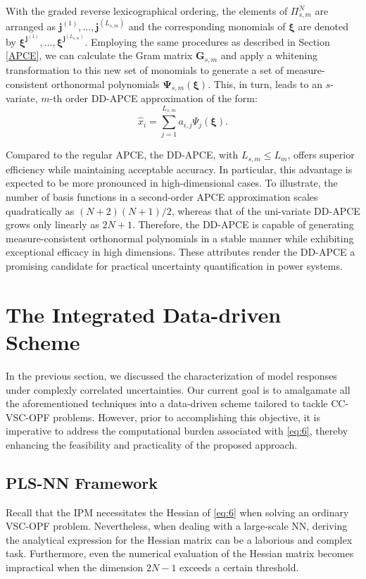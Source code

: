\documentclass[journal]{IEEEtran}
\theoremstyle{definition}
\theoremstyle{remark}
\begin{document}
With the graded reverse lexicographical ordering, the elements of $\Pi_{s,m}^N$ are arranged as $\boldsymbol{j}^{(1)},\dots,\boldsymbol{j}^{(L_{s,m})}$ and the corresponding monomials of $\boldsymbol{\xi}$ are denoted by $\boldsymbol{\xi}^{\boldsymbol{j}^{(1)}},\dots,\boldsymbol{\xi}^{\boldsymbol{j}^{(L_{s,m})}}$. Employing the same procedures as described in Section \ref{APCE}, we can calculate the Gram matrix $\boldsymbol{G}_{s,m}$ and apply a whitening transformation to this new set of monomials to generate a set of measure-consistent orthonormal polynomials $\boldsymbol{\Psi}_{s,m}(\boldsymbol{\xi})$. This, in turn, leads to an $s$-variate, $m$-th order DD-APCE approximation of the form:
\begin{equation}
    \hat{x}_i=\sum\limits_{j=1}^{L_{s,m}}a_{i,j}\Psi_j(\boldsymbol{\xi}).
\end{equation}

Compared to the regular APCE, the DD-APCE, with $L_{s,m}\leq L_{m}$, offers superior efficiency while maintaining acceptable accuracy. In particular, this advantage is expected to be more pronounced in high-dimensional cases. To illustrate, the number of basis functions in a second-order APCE approximation scales quadratically as $(N+2)(N+1)/2$, whereas that of the uni-variate DD-APCE grows only linearly as $2N+1$. 
Therefore, the DD-APCE is capable of generating measure-consistent orthonormal polynomials in a stable manner while exhibiting exceptional efficacy in high dimensions. These attributes render the DD-APCE a promising candidate for practical uncertainty quantification in power systems.
\section{The Integrated Data-driven Scheme}\label{scheme}
In the previous section, we discussed the characterization of model responses under complexly correlated uncertainties. Our current goal is to amalgamate all the aforementioned techniques into a data-driven scheme tailored to tackle CC-VSC-OPF problems. However, prior to accomplishing this objective, it is imperative to address the computational burden associated with \eqref{eq:6}, thereby enhancing the feasibility and practicality of the proposed approach.
\subsection{PLS-NN Framework}
Recall that the IPM necessitates the Hessian of \eqref{eq:6} when solving an ordinary VSC-OPF problem. Nevertheless, when dealing with a large-scale NN, deriving the analytical expression for the Hessian matrix can be a laborious and complex task. Furthermore, even the numerical evaluation of the Hessian matrix becomes impractical when the dimension $2N-1$ exceeds a certain threshold.
\end{document}
